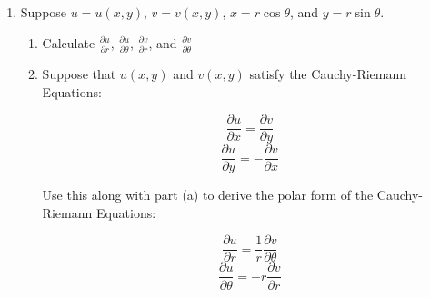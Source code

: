 \documentclass[12pt]{article}
\newif\ifans
\begin{document}
\begin{enumerate}
\ifans{\fbox{\parbox{1\linewidth}{We can express $g$ as $g=f(x,y,z)$, where $x=u-v$, $y=v-w$, and $z=w-u$.  Then, we compute the partial derivatives of $g$ with respect to $u$, $v$, and $w$.

$$\frac{\partial g}{\partial u}=f_x(u-v,v-w,w-u)-f_z(u-v,v-w,w-u)$$
$$\frac{\partial g}{\partial v}=-f_x(u-v,v-w,w-u)+f_y(u-v,v-w,w-u)$$
$$\frac{\partial g}{\partial w}=-f_y(u-v,v-w,w-u)+f_z(u-v,v-w,w-u)$$

Summing these three partial derivatives yields 0.}}} \fi

\newpage

\item Suppose $u=u(x,y)$, $v=v(x,y)$, $x=r\cos{\theta}$, and $y=r\sin{\theta}$.

\begin{enumerate}

\item Calculate $\frac{\partial u}{\partial r}$, $\frac{\partial u}{\partial \theta}$, $\frac{\partial v}{\partial r}$, and $\frac{\partial v}{\partial \theta}$

\ifans{\fbox{\parbox{0.7\linewidth}{$\frac{\partial u}{\partial r}=\frac{\partial u}{\partial x}\cos{\theta}+\frac{\partial u}{\partial y}\sin{\theta}$; $\frac{\partial u}{\partial \theta}=-r\frac{\partial u}{\partial x}\sin{\theta}+r\frac{\partial u}{\partial y}\cos{\theta}$;\\
\\
$\frac{\partial v}{\partial r}=\frac{\partial v}{\partial x}\cos{\theta}+\frac{\partial v}{\partial y}\sin{\theta}$; $\frac{\partial v}{\partial \theta}=-r\frac{\partial v}{\partial x}\sin{\theta}+r\frac{\partial v}{\partial y}\cos{\theta}$}}} \fi

\item Suppose that $u(x,y)$ and $v(x,y)$ satisfy the Cauchy-Riemann Equations:

$$\frac{\partial u}{\partial x}=\frac{\partial v}{\partial y}$$
$$\frac{\partial u}{\partial y}=-\frac{\partial v}{\partial x}$$

Use this along with part (a) to derive the polar form of the Cauchy-Riemann Equations:

$$\frac{\partial u}{\partial r}=\frac{1}{r}\frac{\partial v}{\partial \theta}$$
$$\frac{\partial u}{\partial \theta}=-r\frac{\partial v}{\partial r}$$


\end{enumerate}
\end{enumerate}
\end{document}
